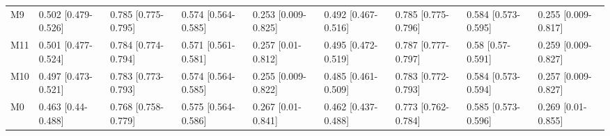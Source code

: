 \begin{table}[ht]
\begin{tabular}{lllllllll}
  M9 & 0.502 [0.479-0.526] & 0.785 [0.775-0.795] & 0.574 [0.564-0.585] & 0.253 [0.009-0.825] & 0.492 [0.467-0.516] & 0.785 [0.775-0.796] & 0.584 [0.573-0.595] & 0.255 [0.009-0.817] \\ 
  M11 & 0.501 [0.477-0.524] & 0.784 [0.774-0.794] & 0.571 [0.561-0.581] & 0.257 [0.01-0.812] & 0.495 [0.472-0.519] & 0.787 [0.777-0.797] & 0.58 [0.57-0.591] & 0.259 [0.009-0.827] \\ 
  M10 & 0.497 [0.473-0.521] & 0.783 [0.773-0.793] & 0.574 [0.564-0.585] & 0.255 [0.009-0.822] & 0.485 [0.461-0.509] & 0.783 [0.772-0.793] & 0.584 [0.573-0.594] & 0.257 [0.009-0.827] \\ 
  M0 & 0.463 [0.44-0.488] & 0.768 [0.758-0.779] & 0.575 [0.564-0.586] & 0.267 [0.01-0.841] & 0.462 [0.437-0.488] & 0.773 [0.762-0.784] & 0.585 [0.573-0.596] & 0.269 [0.01-0.855] \\ 
   \hline
\end{tabular}
\end{table}
